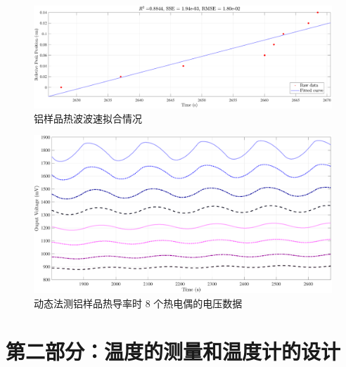 \documentclass[UTF8]{article}
\theoremstyle{MyLineTheoremStyle} %
\theoremstyle{MyBlockTheoremStyle} %
\theoremstyle{MySubsubsectionStyle} %
\begin{document}
\begin{figure}[H]\centering
    \includegraphics[width=\columnwidth]{assets/2 铝/2024-12-10_21-33-07.pdf}
    \caption{铝样品热波波速拟合情况}
    \label{铝样品热波波速拟合情况}
\end{figure}


\begin{figure}[H]\centering
    \includegraphics[width=\columnwidth]{assets/2 铝/2024-12-10_21-32-45.pdf}
    \caption{动态法测铝样品热导率时 8 个热电偶的电压数据}
    \label{动态法测铝样品}
\end{figure}





























\section{第二部分：温度的测量和温度计的设计}
\end{document}
